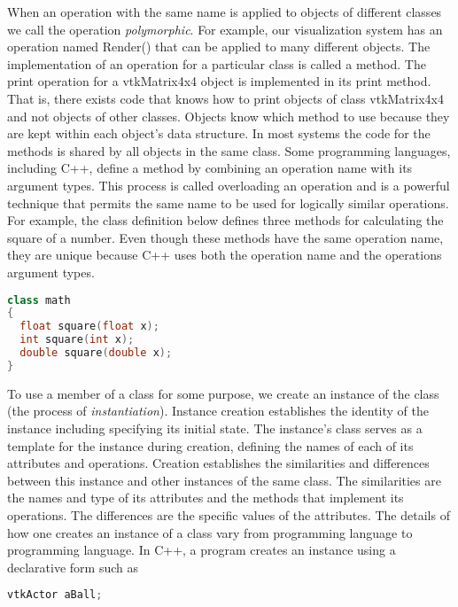 When an operation with the same name is applied to objects of different classes we call the operation \emph{polymorphic}. For example, our visualization system has an operation named Render() that can be applied to many different objects. The implementation of an operation for a particular class is called a method. The print operation for a vtkMatrix4x4 object is implemented in its print method. That is, there exists code that knows how to print objects of class vtkMatrix4x4 and not objects of other classes. Objects know which method to use because they are kept within each object's data structure. In most systems the code for the methods is shared by all objects in the same class. Some programming languages, including C++, define a method by combining an operation name with its argument types. This process is called overloading an operation and is a powerful technique that permits the same name to be used for logically similar operations. For example, the class definition below defines three methods for calculating the square of a number. Even though these methods have the same operation name, they are unique because C++ uses both the operation name and the operations argument types.

\begin{lstlisting}[language=C++, caption={math class.}]
class math
{
  float square(float x);
  int square(int x);
  double square(double x);
}
\end{lstlisting}

To use a member of a class for some purpose, we create an instance of the class (the process of \emph{instantiation}). Instance creation establishes the identity of the instance including specifying its initial state. The instance's class serves as a template for the instance during creation, defining the names of each of its attributes and operations. Creation establishes the similarities and differences between this instance and other instances of the same class. The similarities are the names and type of its attributes and the methods that implement its operations. The differences are the specific values of the attributes. The details of how one creates an instance of a class vary from programming language to programming language. In C++, a program creates an instance using a declarative form such as

\begin{lstlisting}[language=C++,  caption={}, numbers=none, frame=none]
vtkActor aBall;
\end{lstlisting}

